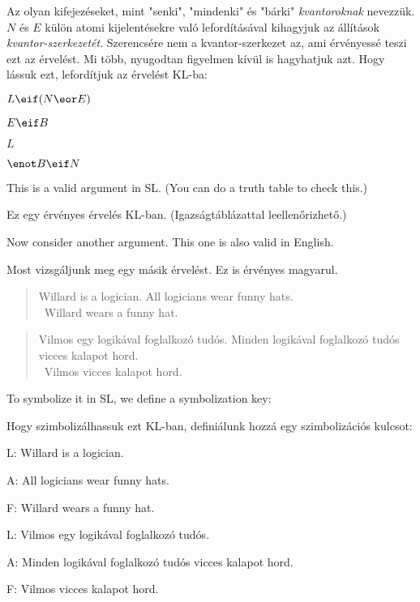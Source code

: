 Az olyan kifejezéseket, mint "senki", "mindenki" és "bárki" \emph{kvantoroknak} nevezzük. $N$ és $E$ külön atomi kijelentésekre való lefordításával kihagyjuk az állítások \emph{kvantor-szerkezetét}. Szerencsére nem a kvantor-szerkezet az, ami érvényessé teszi ezt az érvelést. Mi több, nyugodtan figyelmen kívül is hagyhatjuk azt. Hogy lássuk ezt, lefordítjuk az érvelést KL-ba:
\begin{earg}
\item[]$L \eif (N \eor E)$
\item[]$E \eif B$
\item[]$L$
\item[\therefore]$\enot B \eif N$
\end{earg}
This is a valid argument in SL. (You can do a truth table to check this.) 

Ez egy érvényes érvelés KL-ban. (Igazságtáblázattal leellenőrizhető.)

Now consider another argument. This one is also valid in English.

Most vizsgáljunk meg egy másik érvelést. Ez is érvényes magyarul.

\begin{quote}
\label{willard1}
Willard is a logician. All logicians wear funny hats.\\
\therefore\ Willard wears a funny hat.
\end{quote}

\begin{quote}
\label{willard1}
Vilmos egy logikával foglalkozó tudós. Minden logikával foglalkozó tudós vicces kalapot hord. \\
\therefore\ Vilmos vicces kalapot hord.
\end{quote}

To symbolize it in SL, we define a symbolization key:

Hogy szimbolizálhassuk ezt KL-ban, definiálunk hozzá egy szimbolizációs kulcsot:
\begin{ekey}
\item[L:] Willard is a logician.
\item[A:] All logicians wear funny hats.
\item[F:] Willard wears a funny hat.
\end{ekey}

\begin{ekey}
\item[L:] Vilmos egy logikával foglalkozó tudós.
\item[A:] Minden logikával foglalkozó tudós vicces kalapot hord.
\item[F:] Vilmos vicces kalapot hord.
\end{ekey}

